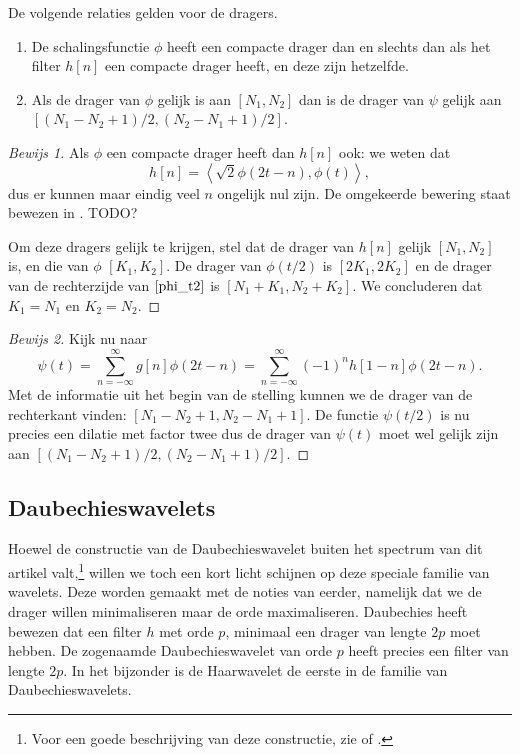 \begin{stelling}
  De volgende relaties gelden voor de dragers.
  \begin{enumerate}
  \item De schalingsfunctie $\phi$ heeft een compacte drager dan en slechts dan als het filter $h[n]$ een compacte drager heeft, en deze zijn hetzelfde.
  \item Als de drager van $\phi$ gelijk is aan $[N_1,N_2]$ dan is de drager van $\psi$ gelijk aan $[(N_1 - N_2 + 1)/2, (N_2 - N_1 + 1)/2]$.
  \end{enumerate}
\end{stelling}
\begin{proof}[Bewijs 1] Als $\phi$ een compacte drager heeft dan $h[n]$ ook: we weten dat
  \[
  h[n] = \left\langle \sqrt{2} \phi\left(2t-n\right), \phi(t) \right\rangle,
  \]
  dus er kunnen maar eindig veel $n$ ongelijk nul zijn. De omgekeerde bewering staat bewezen in \cite[P965-967]{daubechies}. TODO?

  Om deze dragers gelijk te krijgen, stel dat de drager van $h[n]$ gelijk $[N_1,N_2]$ is, en die van $\phi$ $[K_1, K_2]$. De drager van $\phi(t/2)$ is $[2K_1, 2K_2]$ en de drager van de rechterzijde van $\ref{phi_t2}$ is $[N_1 + K_1, N_2 + K_2]$. We concluderen dat $K_1 = N_1$ en $K_2 = N_2$.
\end{proof}
\begin{proof}[Bewijs 2]
  Kijk nu naar
  \[
  \psi\left(t\right) = \sum_{n=-\infty}^{\infty} g[n] \phi(2t-n) = \sum_{n=-\infty}^{\infty} (-1)^{n}h[1-n] \phi(2t-n).
  \]
  Met de informatie uit het begin van de stelling kunnen we de drager van de rechterkant vinden: $[N_1 - N_2 + 1, N_2 - N_1 + 1]$. De functie $\psi(t/2)$ is nu precies een dilatie met factor twee dus de drager van $\psi(t)$ moet wel gelijk zijn aan $[(N_1 - N_2 + 1)/2, (N_2 - N_1 + 1)/2]$.
\end{proof}

\subsection{Daubechieswavelets}
Hoewel de constructie van de Daubechieswavelet buiten het spectrum van dit artikel valt,\footnote{Voor een goede beschrijving van deze constructie, zie \cite{mallat} of \cite{daubechies}.} willen we toch een kort licht schijnen op deze speciale familie van wavelets. Deze worden gemaakt met de noties van eerder, namelijk dat we de drager willen minimaliseren maar de orde maximaliseren. Daubechies heeft bewezen\cite{daubechies} dat een filter $h$ met orde $p$, minimaal een drager van lengte $2p$ moet hebben. De zogenaamde Daubechieswavelet van orde $p$ heeft precies een filter van lengte $2p$. In het bijzonder is de Haarwavelet de eerste in de familie van Daubechieswavelets.

